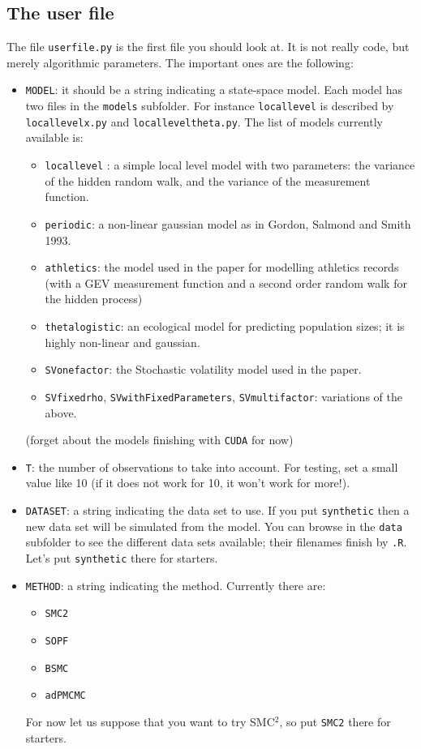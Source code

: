 \documentclass[a4paper,10pt]{paper}
\begin{document}
\subsection{The user file}

The file \texttt{userfile.py} is the first file you should look at. It is not really code, but merely 
algorithmic parameters. The important ones are the following:
\begin{itemize}
 \item \texttt{MODEL}: it should be a string indicating a state-space model. Each model has two files in the \texttt{models} subfolder. For instance
\texttt{locallevel} is described by \texttt{locallevelx.py} and \texttt{localleveltheta.py}. The list of models currently available is:
\begin{itemize}
 \item \texttt{locallevel} : a simple local level model with two parameters: the variance of the hidden random walk, and the variance of the measurement function.
 \item \texttt{periodic}: a non-linear gaussian model as in Gordon, Salmond and Smith 1993.
 \item \texttt{athletics}: the model used in the paper for modelling athletics records (with a GEV measurement function and a second order random walk for the hidden process)
 \item \texttt{thetalogistic}: an ecological model for predicting population sizes; it is highly non-linear and gaussian.
 \item \texttt{SVonefactor}: the Stochastic volatility model used in the paper.
 \item \texttt{SVfixedrho}, \texttt{SVwithFixedParameters}, \texttt{SVmultifactor}: variations of the above.
\end{itemize}
(forget about the models finishing with \texttt{CUDA} for now)
\item \texttt{T}: the number of observations to take into account. For testing, set a small value like 10 (if it does not work for 10, it won't work for more!).
\item \texttt{DATASET}: a string indicating the data set to use. If you put \texttt{synthetic} then a new data set will be simulated from the model.
You can browse in the \texttt{data} subfolder to see the different data sets available; their filenames finish by \texttt{.R}. Let's put \texttt{synthetic} there for starters.
\item \texttt{METHOD}: a string indicating the method. Currently there are:
\begin{itemize}
 \item \texttt{SMC2}
 \item \texttt{SOPF}
 \item \texttt{BSMC}
 \item \texttt{adPMCMC}
\end{itemize}
For now let us suppose that you want to try SMC$^2$, so put \texttt{SMC2} there for starters.
\end{itemize}
\end{document}
